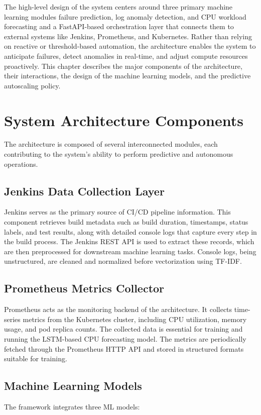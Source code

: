 \documentclass[a4paper,14pt,onecolumn]{report}
\begin{document}
The high-level design of the system centers around three primary machine learning modules failure prediction, log anomaly detection, and CPU workload forecasting and a FastAPI-based orchestration layer that connects them to external systems like Jenkins, Prometheus, and Kubernetes. Rather than relying on reactive or threshold-based automation, the architecture enables the system to anticipate failures, detect anomalies in real-time, and adjust compute resources proactively. This chapter describes the major components of the architecture, their interactions, the design of the machine learning models, and the predictive autoscaling policy.

\section{System Architecture Components}

The architecture is composed of several interconnected modules, each contributing to the system's ability to perform predictive and autonomous operations.

\subsection{Jenkins Data Collection Layer}
Jenkins serves as the primary source of CI/CD pipeline information. This component retrieves build metadata such as build duration, timestamps, status labels, and test results, along with detailed console logs that capture every step in the build process. The Jenkins REST API is used to extract these records, which are then preprocessed for downstream machine learning tasks. Console logs, being unstructured, are cleaned and normalized before vectorization using TF-IDF.

\subsection{Prometheus Metrics Collector}
Prometheus acts as the monitoring backend of the architecture. It collects time-series metrics from the Kubernetes cluster, including CPU utilization, memory usage, and pod replica counts. The collected data is essential for training and running the LSTM-based CPU forecasting model. The metrics are periodically fetched through the Prometheus HTTP API and stored in structured formats suitable for training.

\subsection{Machine Learning Models}
The framework integrates three ML models:
\end{document}

